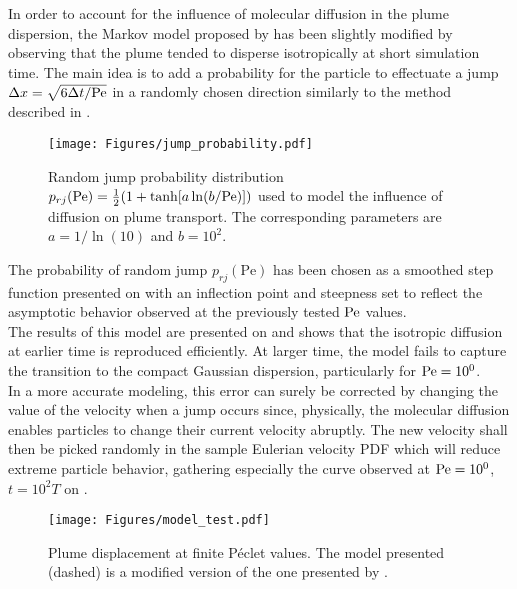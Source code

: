 In order to account for the influence of molecular diffusion in the plume dispersion, the Markov model proposed by \citet{Meyer2016} has been slightly modified by observing that the plume tended to disperse isotropically at short simulation time.
The main idea is to add a probability for the particle to effectuate a jump $\Delta x=\sqrt{6\Delta t/\mathrm{Pe}}$ in a randomly chosen direction similarly to the method described in \citet[Sec. 2.4]{Bijeljic2013}.\\ 
\begin{figure}
	\centering
	\texttt{[image: Figures/jump\_probability.pdf]}
	\caption{Random jump probability distribution $p_{rj}(\mathrm{Pe}) = \frac{1}{2}(1+\tanh[a\ln(b/\mathrm{Pe})])$ used to  model the influence of diffusion on plume transport. The corresponding parameters are $a = 1/\ln(10)$ and $b=10^2$.}
	\label{fig:pj}
\end{figure}
The probability of random jump $p_{rj}(\mathrm{Pe})$ has been chosen as a smoothed step function presented on  with an inflection point and steepness set to reflect the asymptotic behavior observed at the previously tested $\mathrm{Pe}$ values.\\
The results of this model are presented on  and shows that the isotropic diffusion at earlier time is reproduced efficiently.
At larger time, the model fails to capture the transition to the compact Gaussian dispersion, particularly for $\mathrm{Pe} = 10^0$.\\ 
In a more accurate modeling, this error can surely be corrected by changing the value of the velocity when a jump occurs since, physically, the molecular diffusion enables particles to change their current velocity abruptly.
The new velocity shall then be picked randomly in the sample Eulerian velocity PDF which will reduce extreme particle behavior,  gathering especially the curve observed at $\mathrm{Pe} = 10^0$, $t = 10^2 T$ on .
\begin{figure}[h!]
	\centering
	\texttt{[image: Figures/model\_test.pdf]}
	\caption{Plume displacement at finite Péclet values. The model presented (dashed) is a modified version of the one presented by \citet{Meyer2016}.}
	\label{fig:plume_model}
\end{figure}


